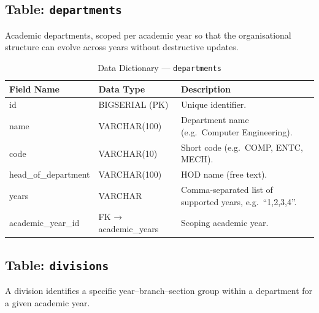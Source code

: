 \subsection{Table: \texttt{departments}}
Academic departments, scoped per academic year so that the organisational structure can evolve across years without destructive updates.

\begin{table}[H]
    \centering
    \renewcommand{\arraystretch}{1.5}
    \begin{tabular}{|p{3.5cm}|p{2.5cm}|p{7.5cm}|}
        \hline
        \textbf{Field Name} & \textbf{Data Type} & \textbf{Description} \\
        \hline
        id & BIGSERIAL (PK) & Unique identifier. \\
        \hline
        name & VARCHAR(100) & Department name (e.g.\ Computer Engineering). \\
        \hline
        code & VARCHAR(10) & Short code (e.g.\ COMP, ENTC, MECH). \\
        \hline
        head\_of\_department & VARCHAR(100) & HOD name (free text). \\
        \hline
        years & VARCHAR & Comma-separated list of supported years, e.g.\ ``1,2,3,4''. \\
        \hline
        academic\_year\_id & FK → academic\_years & Scoping academic year. \\
        \hline
    \end{tabular}
    \caption{Data Dictionary --- \texttt{departments}}
    \label{tab:dd_departments}
\end{table}

\subsection{Table: \texttt{divisions}}
A division identifies a specific year--branch--section group within a department for a given academic year.

